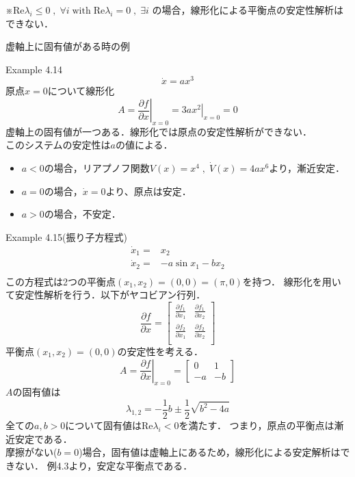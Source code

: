 \documentclass{jsarticle}
\begin{document}
※$\text{Re}\lambda_i \leq 0\;,\;\forall i\; \text{with}\; \text{Re}\lambda_i = 0\;,\;\exists i$ 
の場合，線形化による平衡点の安定性解析はできない．

{\color{gray}\hrulefill}

虚軸上に固有値がある時の例

Example 4.14
\begin{equation*}
  \dot x = ax^3
\end{equation*}
原点$x=0$について線形化
\begin{equation*}
  A = \left.\frac{\partial f}{\partial x}\right|_{x=0} = \left.3ax^2\right|_{x=0} = 0
\end{equation*}
虚軸上の固有値が一つある．線形化では原点の安定性解析ができない．\\
このシステムの安定性は$a$の値による．
\begin{itemize}
  \item $a<0$の場合，リアプノフ関数$V(x)=x^4\;,\;\dot V(x)=4ax^6$より，漸近安定．
  \item $a=0$の場合，$\dot x = 0$より、原点は安定．
  \item $a>0$の場合，不安定．
\end{itemize}

{\color{gray}\hrulefill}

Example 4.15(振り子方程式)
\begin{align*}
  \dot x_1 =& x_2\\
  \dot x_2 =& -a \sin x_1 -b x_2\\
\end{align*}
この方程式は2つの平衡点$(x_1,x_2)=(0,0)=(\pi,0)$を持つ．
線形化を用いて安定性解析を行う．以下がヤコビアン行列．
\begin{equation*}
  \frac{\partial f}{\partial x} = \left[
    \begin{matrix}
      \frac{\partial f_1}{\partial x_1}&\frac{\partial f_1}{\partial x_2}\\
      \frac{\partial f_2}{\partial x_1}&\frac{\partial f_2}{\partial x_2}\\
    \end{matrix}
  \right]
\end{equation*}
平衡点$(x_1,x_2)=(0,0)$の安定性を考える．
\begin{equation*}
  A = \left.\frac{\partial f}{\partial x} \right|_{x=0} = \left[
    \begin{matrix}
      0&1\\ -a&-b
    \end{matrix}
  \right]
\end{equation*}
$A$の固有値は
\begin{equation*}
  \lambda_{1,2} = -\frac{1}{2}b \pm \frac{1}{2}\sqrt{b^2-4a}
\end{equation*}
全ての$a,b>0$について固有値は$\text{Re}\lambda_i<0$を満たす．
つまり，原点の平衡点は漸近安定である．\\
摩擦がない($b=0$)場合，固有値は虚軸上にあるため，線形化による安定解析はできない．
例4.3より，安定な平衡点である．
\end{document}
